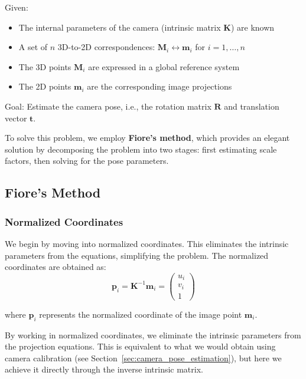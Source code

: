 \documentclass[11pt,a4paper]{article}
\theoremstyle{definition}
\theoremstyle{plain}
\theoremstyle{remark}
\begin{document}
\begin{tcolorbox}[colback=blue!5!white,colframe=blue!75!black,title=\textbf{Problem Statement}]
Given:
\begin{itemize}
    \item The internal parameters of the camera (intrinsic matrix $\mathbf{K}$) are known
    \item A set of $n$ 3D-to-2D correspondences: $\mathbf{M}_i \leftrightarrow \mathbf{m}_i$ for $i = 1, \ldots, n$
    \item The 3D points $\mathbf{M}_i$ are expressed in a global reference system
    \item The 2D points $\mathbf{m}_i$ are the corresponding image projections
\end{itemize}
Goal: Estimate the camera pose, i.e., the rotation matrix $\mathbf{R}$ and translation vector $\mathbf{t}$.
\end{tcolorbox}

To solve this problem, we employ \textbf{Fiore's method}, which provides an elegant solution by decomposing the problem into two stages: first estimating scale factors, then solving for the pose parameters.

\subsection{Fiore's Method}\label{subsec:fiore_method}

\subsubsection{Normalized Coordinates}

We begin by moving into normalized coordinates. This eliminates the intrinsic parameters from the equations, simplifying the problem. The normalized coordinates are obtained as:
\begin{equation} \nonumber
\mathbf{p}_i = \mathbf{K}^{-1} \mathbf{m}_i = \begin{pmatrix} u_i \\ v_i \\ 1 \end{pmatrix}
\end{equation}

where $\mathbf{p}_i$ represents the normalized coordinate of the image point $\mathbf{m}_i$.

\begin{tcolorbox}[colback=green!5!white,colframe=green!75!black,title=\textbf{Normalized Coordinates}]
By working in normalized coordinates, we eliminate the intrinsic parameters from the projection equations. This is equivalent to what we would obtain using camera calibration (see Section~\ref{sec:camera_pose_estimation}), but here we achieve it directly through the inverse intrinsic matrix.
\end{tcolorbox}
\end{document}
